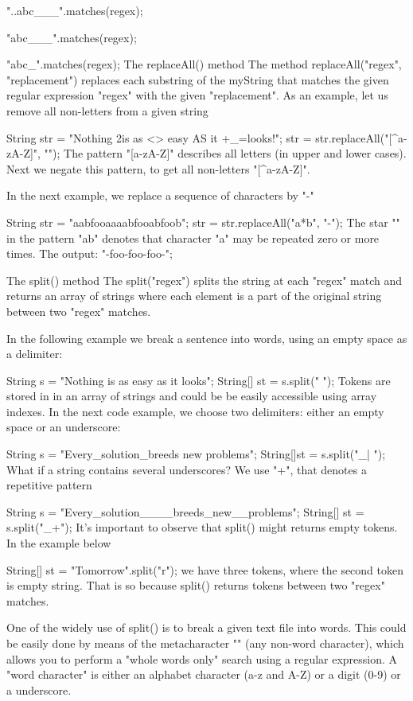 "..abc___".matches(regex);

"abc___".matches(regex);

"abc_".matches(regex);
The replaceAll() method
The method replaceAll("regex", "replacement") replaces each substring of the myString that matches the given regular expression "regex" with the given "replacement". As an example, let us remove all non-letters from a given string

String str = "Nothing 2is as <> easy AS it +_=looks!";
str = str.replaceAll("[^a-zA-Z]", "");
The pattern "[a-zA-Z]" describes all letters (in upper and lower cases). Next we negate this pattern, to get all non-letters "[^a-zA-Z]".

In the next example, we replace a sequence of characters by "-"

String str = "aabfooaaaabfooabfoob";
str = str.replaceAll("a*b", "-");
The star "" in the pattern "ab" denotes that character "a" may be repeated zero or more times. The output: "-foo-foo-foo-";

The split() method
The split("regex") splits the string at each "regex" match and returns an array of strings where each element is a part of the original string between two "regex" matches.

In the following example we break a sentence into words, using an empty space as a delimiter:

String s = "Nothing is as easy as it looks";
String[] st = s.split(" ");
Tokens are stored in in an array of strings and could be be easily accessible using array indexes. In the next code example, we choose two delimiters: either an empty space or an underscore:

String s = "Every_solution_breeds new problems";
String[]st = s.split("_| ");
What if a string contains several underscores? We use "+", that denotes a repetitive pattern

String s = "Every_solution____breeds_new__problems";
String[] st = s.split("_+");
It's important to observe that split() might returns empty tokens. In the example below

String[] st = "Tomorrow".split("r");
we have three tokens, where the second token is empty string. That is so because split() returns tokens between two "regex" matches.

One of the widely use of split() is to break a given text file into words. This could be easily done by means of the metacharacter "\W" (any non-word character), which allows you to perform a "whole words only" search using a regular expression. A "word character" is either an alphabet character (a-z and A-Z) or a digit (0-9) or a underscore.


